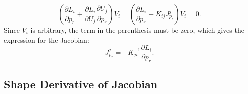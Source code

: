 \documentclass[journal]{IEEEtran}
\theoremstyle{definition}
\begin{document}
\begin{equation}
  \left(\frac{\partial L_i}{\partial p_r} + \frac{\partial L_i}{\partial U_j}\frac{\partial U_j}{\partial p_r}\right)V_i = \left(\frac{\partial L_i}{\partial p_r} + K_{ij}J^j_{p_r}\right)V_i = 0.
\end{equation}
Since $V_i$ is arbitrary, the term in the parenthesis must be zero, which gives the expression for the Jacobian:
\begin{equation}
  J^j_{p_r} = -K^{-1}_{ji}\frac{\partial L_i}{\partial p_r}.
\end{equation}

\subsection{Shape Derivative of Jacobian}
\label{sec:shape_derivative_jacobian}
\end{document}
